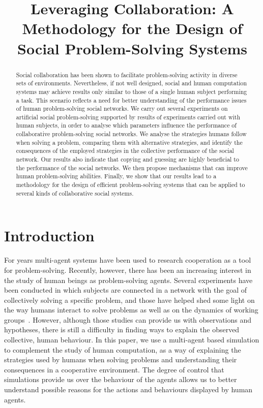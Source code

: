 \documentclass{article}
\title{Leveraging Collaboration: 
A Methodology for the Design of Social Problem-Solving Systems}
\begin{document}
\maketitle

\begin{abstract}
Social collaboration has been shown to facilitate problem-solving activity in diverse sets of environments. 
Nevertheless, if not well designed, social and human computation systems may achieve results 
only similar to those of a single human subject performing a task. 
This scenario reflects a need for better understanding of the performance 
issues of human problem-solving social networks. 
We carry out several experiments on artificial social problem-solving 
supported by results of experiments carried out with human subjects, 
in order to analyse which parameters influence the performance of collaborative problem-solving social networks. 
We analyse the strategies humans follow when solving a problem, 
comparing them with alternative strategies, and 
identify the consequences of the employed strategies 
in the collective performance of the social network.
Our results also indicate that copying and guessing are highly beneficial to the 
performance of the social networks. 
We then propose mechanisms that can improve human problem-solving abilities.
Finally, we show that our results lead to a methodology for the design  
of efficient problem-solving systems that can be applied 
to several kinds of collaborative social systems. 
\end{abstract}

\section{Introduction}

For years multi-agent systems have been used to research cooperation as a tool for problem-solving. %
Recently, however, there has been an increasing interest in the study of human beings as problem-solving agents. Several experiments have been conducted in which subjects are connected in a network with the goal of collectively solving a specific problem, and those have helped shed some light on the way humans interact to solve problems as well as on the dynamics of working groups~\cite{woolley:evidencecollective}. However, although those studies can provide us with observations and hypotheses, there is still a difficulty in finding ways to explain the observed collective, human behaviour. In this paper, we use a multi-agent based simulation to complement %
the study of human computation, as a way of explaining the strategies used by humans when solving problems and understanding their consequences in a cooperative environment. The degree of control that simulations provide us over the behaviour of the agents allows us to better understand possible reasons for the actions and behaviours displayed by human agents.
\end{document}

